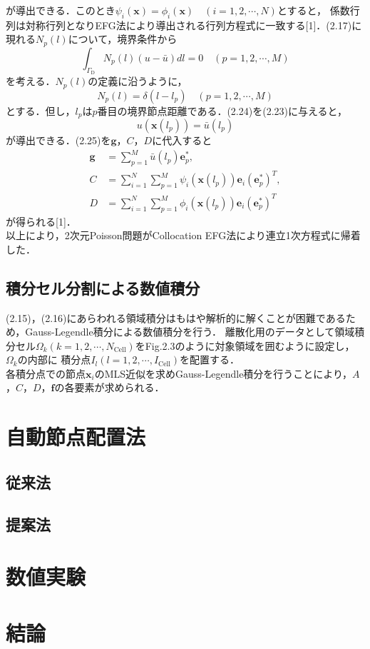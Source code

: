 \documentclass[twocolumn,head_space=15.0mm,foot_space=15.0mm,fleqn]{jlreq}
\numberwithin{equation}{section}
\begin{document}
が導出できる．このとき$\psi_i \left( \boldsymbol{x} \right) = \phi_i \left( \boldsymbol{x} \right) \quad \left( i=1,2, \cdots, N \right)$とすると，
係数行列は対称行列となりEFG法により導出される行列方程式に一致する[1]．(2.17)に現れる$N_p \left( l \right)$について，境界条件から
\begin{equation}
	\int_{\Gamma_{\mathrm{D}}} N_p \left( l \right) \left( u- \bar{u} \right) dl = 0 \quad \left( p=1,2, \cdots, M \right)
\end{equation}
を考える．$N_p \left( l \right)$の定義に沿うように，
\begin{equation}
	N_p \left( l \right) = \delta \left( l- l_p \right) \quad \left( p = 1, 2, \cdots, M \right)
\end{equation}
とする．但し，$l_p$は$p$番目の境界節点距離である．(2.24)を(2.23)に与えると，
\begin{equation}
	u \left( \boldsymbol{x} \left( l_p \right) \right) = \bar{u} \left( l_p \right)
\end{equation}
が導出できる．(2.25)を$\boldsymbol{g}$，$C$，$D$に代入すると
\begin{align*}
	\boldsymbol{g} &= \sum_{p=1}^M \bar{u} \left( l_p \right) \boldsymbol{e}_p^* , \\
	C &= \sum_{i=1}^N \sum_{p=1}^M \psi_i \left( \boldsymbol{x} \left( l_p \right) \right) \boldsymbol{e}_i \left( \boldsymbol{e}_p^* \right)^T , \\
	D &= \sum_{i=1}^N \sum_{p=1}^M \phi_i \left( \boldsymbol{x} \left( l_p \right) \right) \boldsymbol{e}_i \left( \boldsymbol{e}_p^* \right)^T
\end{align*}
が得られる[1]． \\
以上により，2次元Poisson問題がCollocation EFG法により連立1次方程式に帰着した．

\subsection{積分セル分割による数値積分}
(2.15)，(2.16)にあらわれる領域積分はもはや解析的に解くことが困難であるため，Gauss-Legendle積分による数値積分を行う．
離散化用のデータとして領域積分セル$\Omega_k \left( k = 1, 2, \cdots, N_{\mathrm{Cell}} \right)$をFig.2.3のように対象領域を囲むように設定し，$\Omega_k$の内部に
積分点$I_l \left( l = 1, 2, \cdots, I_{\mathrm{Cell}} \right) $を配置する．\\
各積分点での節点$\boldsymbol{x}_i$のMLS近似を求めGauss-Legendle積分を行うことにより，$A$，$C$，$D$，$\boldsymbol{f}$の各要素が求められる．

\section{自動節点配置法}

\subsection{従来法}
\subsection{提案法}

\section{数値実験}

\section{結論}
\end{document}
